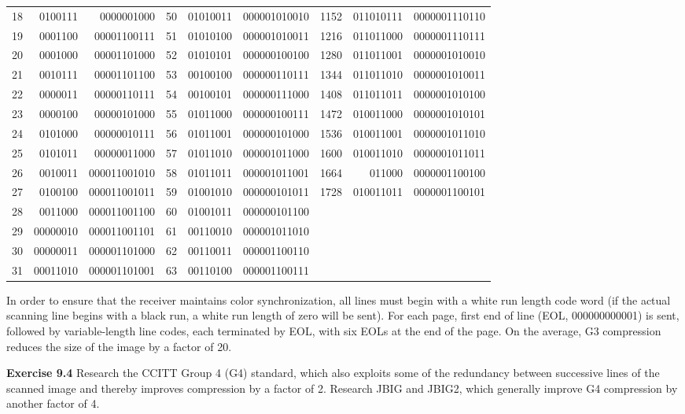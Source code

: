 \begin{center}
{\begin{tabular}{|rrr|rrr|rrr|}
18 & 0100111 & 0000001000 &  50 & 01010011 & 000001010010 & 1152 & 011010111 & 0000001110110\\
19 & 0001100 & 00001100111 &  51 & 01010100 & 000001010011 & 1216 & 011011000 & 0000001110111\\
20 & 0001000 & 00001101000 &  52 & 01010101 & 000000100100 & 1280 & 011011001 & 0000001010010\\
21 & 0010111 & 00001101100 &  53 & 00100100 & 000000110111 & 1344 & 011011010 & 0000001010011\\
22 & 0000011 & 00000110111 &  54 & 00100101 & 000000111000 & 1408 & 011011011 & 0000001010100\\
23 & 0000100 & 00000101000 &  55 & 01011000 & 000000100111 & 1472 & 010011000 & 0000001010101\\
24 & 0101000 & 00000010111 &  56 & 01011001 & 000000101000 & 1536 & 010011001 & 0000001011010\\
25 & 0101011 & 00000011000 &  57 & 01011010 & 000001011000 & 1600 & 010011010 & 0000001011011\\
26 & 0010011 & 000011001010 &  58 & 01011011 & 000001011001 & 1664 & 011000 & 0000001100100\\
27 & 0100100 & 000011001011 &  59 & 01001010 & 000000101011 & 1728 & 010011011 & 0000001100101\\
28 & 0011000 & 000011001100 &  60 & 01001011 & 000000101100 & & & \\
29 & 00000010 & 000011001101 &  61 & 00110010 & 000001011010 &  & & \\ 
30 & 00000011 & 000001101000 &  62 & 00110011 & 000001100110 & & & \\
31 & 00011010 & 000001101001 &  63 & 00110100 & 000001100111 & & &\\
\hline
\end{tabular}
}
\end{center}

\medskip
\noindent
In order to ensure that the receiver maintains color synchronization, all
lines must begin with a white run length code word (if the actual scanning
line begins with a black run, a white run length of zero will be sent). For
each page, first end of line (EOL, 000000000001) is sent, followed by
variable-length line codes, each terminated by EOL, with six EOLs at the end
of the page. On the average, G3 compression reduces the size of the image 
by a factor of 20. 

\smallskip\noindent
{\bf Exercise 9.4} Research the CCITT Group 4 (G4) standard, which also
exploits some of the redundancy between successive lines of the scanned image
and thereby improves compression by a factor of 2.  Research JBIG and JBIG2,
which generally improve G4 compression by another factor of 4.

